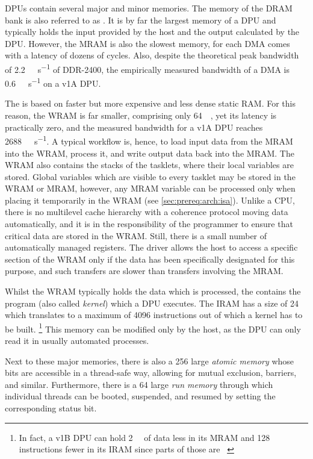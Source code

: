 \Acp{DPU} contain several major and minor memories.
The memory of the \ac{DRAM} bank is also referred to as .
It is by far the largest memory of a \ac{DPU} and typically holds the input provided by the host and the output calculated by the \ac{DPU}.
However, the \ac{MRAM} is also the slowest memory, for each \ac{DMA} comes with a latency of dozens of cycles.
Also, despite the theoretical peak bandwidth of \qty{2.2}{\gibi\byte\per\second} of \ac{DDR}-2400, the empirically measured bandwidth of a \ac{DMA} is \qty{0.6}{\gibi\byte\per\second} on a v1A \ac{DPU}.

The  is based on faster but more expensive and less dense static \ac{RAM}.
For this reason, the \ac{WRAM} is far smaller, comprising only \qty{64}{\kibi\byte}, yet its latency is practically zero, and the measured bandwidth for a v1A \ac{DPU} reaches \qty{2688}{\mebi\byte\per\second}.
A typical workflow is, hence, to load input data from the \ac{MRAM} into the \ac{WRAM}, process it, and write output data back into the \ac{MRAM}.
The \ac{WRAM} also contains the stacks of the tasklets, where their local variables are stored.
Global variables which are visible to every tasklet may be stored in the \ac{WRAM} or \ac{MRAM}, however, any \ac{MRAM} variable can be processed only when placing it temporarily in the \ac{WRAM} (see \cref{sec:prereq:arch:isa}).
Unlike a \ac{CPU}, there is no multilevel cache hierarchy with a coherence protocol moving data automatically, and it is in the responsibility of the programmer to ensure that critical data are stored in the \ac{WRAM}.
Still, there is a small number of automatically managed registers.
The driver allows the host to access a specific section of the \ac{WRAM} only if the data has been specifically designated for this purpose, and such transfers are slower than transfers involving the \ac{MRAM}.

Whilst the \ac{WRAM} typically holds the data which is processed, the  contains the program (also called \emph{kernel}) which a \ac{DPU} executes.
The \ac{IRAM} has a size of \qty{24}{\kibi\byte} which translates to a maximum of \num{4096} instructions out of which a kernel has to be built.%
\footnote{
	In fact, a v1B \ac{DPU} can hold \qty{2}{\kibi\byte} of data less in its \ac{MRAM} and 128 instructions fewer in its \ac{IRAM} since parts of those are ~\cite[Introduction~-- DPU chip characteristics]{upmemSDK}
}
This memory can be modified only by the host, as the \ac{DPU} can only read it in usually automated processes.

Next to these major memories, there is also a \qty{256}{\bits} large \emph{atomic memory} whose bits are accessible in a thread-safe way, allowing for mutual exclusion, barriers, and similar.
Furthermore, there is a \qty{64}{\bits} large \emph{run memory} through which individual threads can be booted, suspended, and resumed by setting the corresponding status bit.
